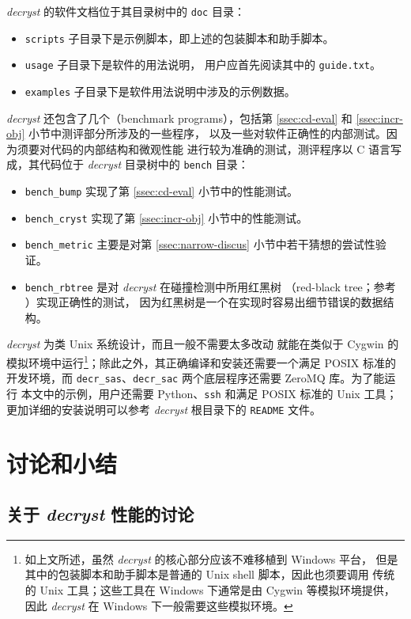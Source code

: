 \emph{decryst} 的软件文档位于其目录树中的 \verb|doc| 目录：
\begin{itemize}
\item \verb|scripts| 子目录下是示例脚本，即上述的包装脚本和助手脚本。
\item \verb|usage| 子目录下是软件的用法说明，
	用户应首先阅读其中的 \verb|guide.txt|。
\item \verb|examples| 子目录下是软件用法说明中涉及的示例数据。
\end{itemize}

\emph{decryst} 还包含了几个（benchmark programs），包括第
\ref{ssec:cd-eval} 和 \ref{ssec:incr-obj} 小节中测评部分所涉及的一些程序，
以及一些对软件正确性的内部测试。因为须要对代码的内部结构和微观性能
进行较为准确的测试，测评程序以 C 语言写成，其代码位于
\emph{decryst} 目录树中的 \verb|bench| 目录：
\begin{itemize}
\item \verb|bench_bump| 实现了第 \ref{ssec:cd-eval} 小节中的性能测试。
\item \verb|bench_cryst| 实现了第 \ref{ssec:incr-obj} 小节中的性能测试。
\item \verb|bench_metric| 主要是对第 \ref{ssec:narrow-discus}
	小节中若干猜想的尝试性验证。
\item \verb|bench_rbtree| 是对 \emph{decryst} 在碰撞检测中所用红黑树
	（red-black tree；参考 \cite[308-338]{cormen2009}）实现正确性的测试，
	因为红黑树是一个在实现时容易出细节错误的数据结构。
\end{itemize}

\emph{decryst} 为类 Unix 系统设计，而且一般不需要太多改动
就能在类似于 Cygwin 的模拟环境中运行\footnote{%
	如上文所述，虽然 \emph{decryst} 的核心部分应该不难移植到 Windows 平台，
	但是其中的包装脚本和助手脚本是普通的 Unix shell 脚本，因此也须要调用
	传统的 Unix 工具；这些工具在 Windows 下通常是由 Cygwin 等模拟环境提供，
	因此 \emph{decryst} 在 Windows 下一般需要这些模拟环境。%
}；除此之外，其正确编译和安装还需要一个满足 POSIX 标准的开发环境，而
\verb|decr_sas|、\verb|decr_sac| 两个底层程序还需要 ZeroMQ 库。为了能运行
本文中的示例，用户还需要 Python、\verb|ssh| 和满足 POSIX 标准的 Unix 工具；
更加详细的安装说明可以参考 \emph{decryst} 根目录下的 \verb|README| 文件。

\section{讨论和小结}
\subsection{关于 \emph{decryst} 性能的讨论}

